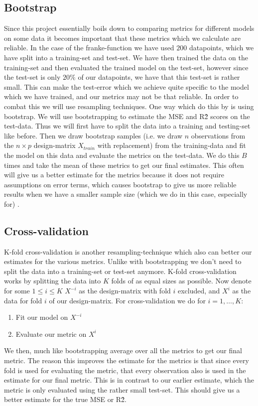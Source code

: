 \documentclass{article}
\begin{document}
\subsection{Bootstrap}
Since this project essentially boils down to comparing metrics for different
models on some data it becomes important that these metrics which we calculate
are reliable. In the case of the franke-function we have used $200$ datapoints,
which we have split into a training-set and test-set. We have then trained the
data on the training-set and then evaluated the trained model on the test-set,
however since the test-set is only $20\%$ of our datapoints, we have that this
test-set is rather small. This can make the test-error which we achieve quite
specific to the model which we have trained, and our metrics may not be that
reliable. In order to combat this we will use resampling techniques. One way
which do this by is using bootstrap. We will use bootstrapping to estimate the
MSE and R\^2 scores on the test-data. Thus we will first have to split the data
into a training and testing-set like before. Then we draw bootstrap samples
(i.e. we draw $n$ observations from the $n\times p$ design-matrix $X_{train}$
with replacement) from the training-data and fit the model on this data and
evaluate the metrics on the test-data. We do this $B$ times and take the mean of
these metrics to get our final estimates. This often will give us a better
estimate for the metrics because it does not require assumptions on error terms,
which causes bootstrap to give us more reliable results when we have a smaller
sample size (which we do in this case, especially for) \cite[s.~5.3]{lecturenotes5}.

\subsection{Cross-validation}
K-fold cross-validation is another resampling-technique which also can better our
estimates for the various metrics. Unlike with bootstrapping we don't need to
split the data into a training-set or test-set anymore. K-fold cross-validation
works by splitting the data into $K$ folds of as equal sizes as possible. Now
denote for some $1 \leq i \leq K$ $X^{-i}$ as the design-matrix with fold $i$
excluded, and $X^i$ as the data for fold $i$ of our design-matrix. For
cross-validation we do for $i = 1, \dots, K$:
\begin{enumerate}
    \item Fit our model on $X^{-i}$
    \item Evaluate our metric on $X^{i}$
\end{enumerate}
We then, much like bootstrapping average over all the metrics to get our final
metric. The reason this improves the estimate for the metrics is that since
every fold is used for evaluating the metric, that every observation also is
used in the estimate for our final metric. This is in contrast to our earlier
estimate, which the metric is only evaluated using the rather small test-set.
This should give us a better estimate for the true MSE or R\^2.
\end{document}
